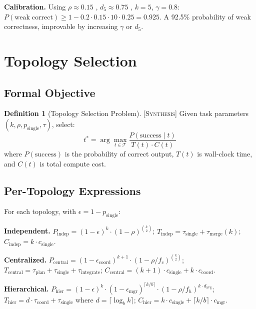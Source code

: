 \documentclass[11pt]{article}
\theoremstyle{definition}
\newtheorem{definition}[theorem]{Definition}
\theoremstyle{remark}
\newcommand{\synthesis}{\textsc{[Synthesis]}}
\begin{document}
\textbf{Calibration.}
Using $\rho \approx 0.15$ \citep{KasiSarma2013}, $d_5 \approx 0.75$ \citep{Sousa2018}, $k = 5$, $\gamma = 0.8$:
$P(\mathrm{weak\;correct}) \geq 1 - 0.2 \cdot 0.15 \cdot 10 \cdot 0.25 = 0.925$.
A 92.5\% probability of weak correctness, improvable by increasing $\gamma$ or $d_5$.


\section{Topology Selection}
\label{sec:topology}

\subsection{Formal Objective}

\begin{definition}[Topology Selection Problem] \synthesis{}
Given task parameters $(k, \rho, p_{\mathrm{single}}, \tau)$, select:
\begin{equation}
\label{eq:topology-obj}
  t^* = \arg\max_{t \in \mathcal{T}} \frac{P(\mathrm{success} \mid t)}{T(t) \cdot C(t)}
\end{equation}
where $P(\mathrm{success})$ is the probability of correct output, $T(t)$ is wall-clock time, and $C(t)$ is total compute cost.
\end{definition}

\subsection{Per-Topology Expressions}

For each topology, with $\epsilon = 1 - p_{\mathrm{single}}$:

\medskip
\noindent\textbf{Independent.}
$P_{\mathrm{indep}} = (1-\epsilon)^k \cdot (1-\rho)^{\binom{k}{2}}$;
$T_{\mathrm{indep}} = \tau_{\mathrm{single}} + \tau_{\mathrm{merge}}(k)$;
$C_{\mathrm{indep}} = k \cdot c_{\mathrm{single}}$.

\medskip
\noindent\textbf{Centralized.}
$P_{\mathrm{central}} = (1-\epsilon_{\mathrm{coord}})^{k+1} \cdot (1-\rho/f_c)^{\binom{k}{2}}$;
$T_{\mathrm{central}} = \tau_{\mathrm{plan}} + \tau_{\mathrm{single}} + \tau_{\mathrm{integrate}}$;
$C_{\mathrm{central}} = (k+1) \cdot c_{\mathrm{single}} + k \cdot c_{\mathrm{coord}}$.

\medskip
\noindent\textbf{Hierarchical.}
$P_{\mathrm{hier}} = (1-\epsilon)^k \cdot (1-\epsilon_{\mathrm{mgr}})^{\lceil k/b \rceil} \cdot (1-\rho/f_h)^{k \cdot d_{\mathrm{avg}}}$;
$T_{\mathrm{hier}} = d \cdot \tau_{\mathrm{coord}} + \tau_{\mathrm{single}}$ where $d = \lceil \log_b k \rceil$;
$C_{\mathrm{hier}} = k \cdot c_{\mathrm{single}} + \lceil k/b \rceil \cdot c_{\mathrm{mgr}}$.
\end{document}
